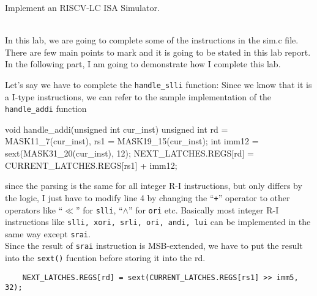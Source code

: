 \documentclass[12pt, a4paper]{article}
\begin{document}
\begin{qNoMark}
Implement an RISCV-LC ISA Simulator. 
\end{qNoMark}

\begin{ans}
\\\indent In this lab, we are going to complete some of the instructions in the sim.c file. 
There are few main points to mark and it is going to be stated in this lab report. 
In the following part, I am going to demonstrate how I complete this lab. 

Let's say we have to complete the \texttt{handle\_slli} function: 
Since we know that it is a I-type instructions, we can refer to the sample implementation of the \texttt{handle\_addi} function
\begin{code}
void handle_addi(unsigned int cur_inst) {
    unsigned int rd = MASK11_7(cur_inst), rs1 = MASK19_15(cur_inst);
    int imm12 = sext(MASK31_20(cur_inst), 12);
    NEXT_LATCHES.REGS[rd] = CURRENT_LATCHES.REGS[rs1] + imm12;
}
\end{code}
since the parsing is the same for all integer R-I instructions, but only differs by the logic, I just have to modify line 4
by changing the ``\texttt{+}'' operator to other operators like ``$\ll$'' for \texttt{slli}, ``$\wedge$'' for \texttt{ori} etc. 
Basically most integer R-I instructions like \texttt{slli, xori, srli, ori, andi, lui} can be implemented in the same way except \texttt{srai}. 
\\Since the result of \texttt{srai} instruction is MSB-extended, we have to put the result into the \texttt{sext()} fucntion before storing it into the rd. 
\begin{verbatim}
    NEXT_LATCHES.REGS[rd] = sext(CURRENT_LATCHES.REGS[rs1] >> imm5, 32);
\end{verbatim}



\end{ans}
\end{document}
